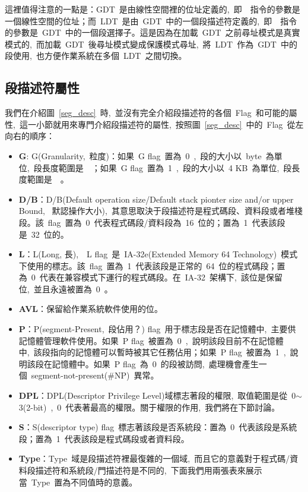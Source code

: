 這裡值得注意的一點是：GDT~是由線性空間裡的位址定義的,~即~~指令的參數是一個線性空間的位址；而~LDT~是由~GDT~中的一個段描述符定義的,~即~~指令的參數是~GDT~中的一個段選擇子。這是因為在加載~GDT~之前尋址模式是真實模式的,~而加載~GDT~後尋址模式變成保護模式尋址,~將~LDT~作為~GDT~中的段使用,~也方便作業系統在多個~LDT~之間切換。

\subsection{段描述符屬性} \label{CHpm_desattr}

我們在介紹圖~\ref{seg_desc}~時,~並沒有完全介紹段描述符的各個~Flag~和可能的屬性,~這一小節就用來專門介紹段描述符的屬性,~按照圖~\ref{seg_desc}~中的~Flag~從左向右的順序：

\begin{itemize}
\item{\textbf{G}}: G(Granularity,~粒度)：如果~G flag~置為~0~,~段的大小以~byte~為單位,~段長度範圍是~~；如果~G flag~置為~1~,~段的大小以~4 KB~為單位,~段長度範圍是~~。
\item{\textbf{D/B}}：D/B(Default operation size/Default stack pionter size and/or upper Bound,~ 默認操作大小),~其意思取決于段描述符是程式碼段、資料段或者堆棧段。該~flag~置為~0~代表程式碼段/資料段為~16~位的；置為~1~代表該段是~32~位的。
\item{\textbf{L}}：L(Long, 長),~~L flag~是~IA-32e(Extended Memory 64 Technology)~模式下使用的標志。該~flag~置為~1~代表該段是正常的~64~位的程式碼段；置為~0~代表在兼容模式下運行的程式碼段。在~IA-32~架構下,~該位是保留位,~並且永遠被置為~0~。
\item{\textbf{AVL}}：保留給作業系統軟件使用的位。
\item{\textbf{P}}：P(segment-Present,~段佔用？) flag~用于標志段是否在記憶體中,~主要供記憶體管理軟件使用。如果~P flag~被置為~0~,~說明該段目前不在記憶體中,~該段指向的記憶體可以暫時被其它任務佔用；如果~P flag~被置為~1~,~說明該段在記憶體中。如果~P flag~為~0~的段被訪問,~處理機會產生一個~segment-not-present(\#NP)~異常。
\item{\textbf{DPL}}：DPL(Descriptor Privilege Level)域標志著段的權限,~取值範圍是從~0$\sim$3(2-bit)~,~0~代表著最高的權限。關于權限的作用,~我們將在下節討論。
\item{\textbf{S}}：S(descriptor type) flag~標志著該段是否系統段：置為~0~代表該段是系統段；置為~1~代表該段是程式碼段或者資料段。
\item{\textbf{Type}}：Type~域是段描述符裡最復雜的一個域,~而且它的意義對于程式碼/資料段描述符和系統段/門描述符是不同的,~下面我們用兩張表來展示當~Type~置為不同值時的意義。


\end{itemize}

